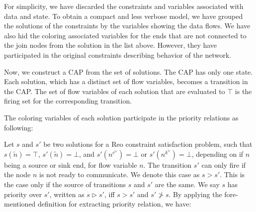 For simplicity, we have discarded the constraints and variables associated with data and state. 
To obtain a compact and less verbose model, we have grouped the solutions of the constraints by the variables showing the data flows.
We have also hid the coloring associated variables for the ends that are 
not connected to the join nodes from the solution in the list above. %
However, they have participated in the original constraints describing behavior of the network.

Now, we construct a CAP from the set of solutions. The CAP has only one state.
Each solution, which has a distinct %
set of flow variables, becomes a transition in the CAP. The set of flow variables of each solution that are evaluated to $\top$ is the firing set for the corresponding transition.


The coloring variables of each solution participate in the priority relations as following:

Let $s$ and $s'$ be two solutions for a Reo constraint satisfaction problem, such that $s(\tilde{n})=\top$, $s'(\tilde{n})=\bot$, and $s'(n^{c^\triangleright})=\bot$ or $s'(n^{k^\triangleright})=\bot$, depending on if $n$ being a source or sink end, for flow variable $n$. The transition $s'$ can only fire if the node $n$ is not ready to communicate. We denote this case as $s > s'$. This is the case only if the source of transitions $s$ and $s'$ are the same. We say $s$ has priority over $s'$, written as $s \triangleright s'$, iff $s > s'$ and $s' \ngtr s$. 
By applying the fore-mentioned definition for extracting priority relation, we have:



